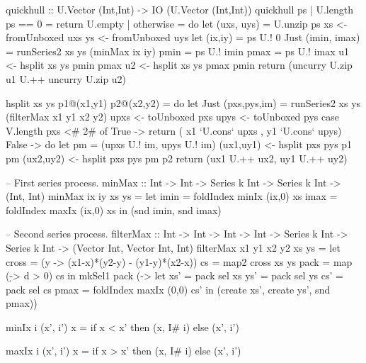 \begin{small}
\begin{code}
quickhull :: U.Vector (Int,Int) 
          -> IO (U.Vector (Int,Int))
quickhull ps
 | U.length ps == 0  = return U.empty
 | otherwise
 = do   let (uxs, uys) = U.unzip ps
        xs      <- fromUnboxed uxs
        ys      <- fromUnboxed uys
        let (ix,iy) = ps U.! 0
            Just (imin, imax) 
             = runSeries2 xs ys (minMax ix iy)
            pmin    = ps U.! imin
            pmax    = ps U.! imax
        u1      <- hsplit xs ys pmin pmax
        u2      <- hsplit xs ys pmax pmin
        return (uncurry U.zip u1 U.++ uncurry U.zip u2)

hsplit xs ys p1@(x1,y1) p2@(x2,y2)
 = do  let Just (pxs,pys,im) 
            = runSeries2 xs ys (filterMax x1 y1 x2 y2)
       upxs   <- toUnboxed pxs
       upys   <- toUnboxed pys
       case V.length pxs <# 2# of
        True
         ->    return ( x1 `U.cons` upxs
                      , y1 `U.cons` upys)
        False
         -> do let pm = (upxs U.! im, upys U.! im)
               (ux1,uy1) <- hsplit pxs pys p1 pm
               (ux2,uy2) <- hsplit pxs pys pm p2
               return (ux1 U.++ ux2, uy1 U.++ uy2)

-- First series process.
minMax    :: Int          -> Int
          -> Series k Int -> Series k Int
          -> (Int, Int)
minMax ix iy xs ys
 = let imin = foldIndex minIx (ix,0) xs
       imax = foldIndex maxIx (ix,0) xs
   in  (snd imin, snd imax)

-- Second series process.
filterMax :: Int -> Int
          -> Int -> Int
          -> Series k Int -> Series k Int
          -> (Vector Int, Vector Int, Int)
filterMax x1 y1 x2 y2 xs ys
 = let cross = (\x y -> (x1-x)*(y2-y) - (y1-y)*(x2-x))
       cs    = map2 cross xs ys
       pack  = map  (\d -> d > 0) cs
   in mkSel1 pack (\sel ->
       let xs'   = pack sel xs
           ys'   = pack sel ys
           cs'   = pack sel cs
           pmax  = foldIndex maxIx (0,0) cs'
       in  (create xs', create ys', snd pmax))

minIx i (x', i') x 
 = if x < x' then (x, I# i) else (x', i')

maxIx i (x', i') x 
 = if x > x' then (x, I# i) else (x', i')
\end{code}
\end{small}
